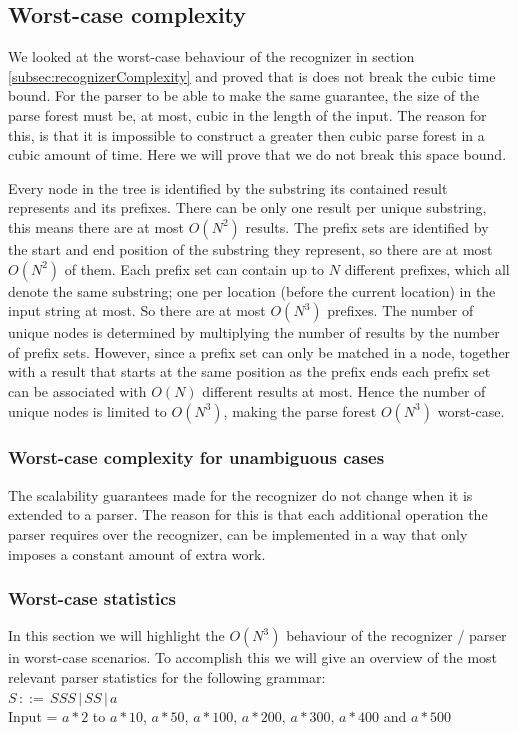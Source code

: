 \documentclass[a4paper,10pt]{article}
\begin{document}
\subsection{Worst-case complexity}

We looked at the worst-case behaviour of the recognizer in section \ref{subsec:recognizerComplexity} and proved that is does not break the cubic time bound. For the parser to be able to make the same guarantee, the size of the parse forest must be, at most, cubic in the length of the input. The reason for this, is that it is impossible to construct a greater then cubic parse forest in a cubic amount of time. Here we will prove that we do not break this space bound.

Every node in the tree is identified by the substring its contained result represents and its prefixes. There can be only one result per unique substring, this means there are at most $O(N^2)$ results. The prefix sets are identified by the start and end position of the substring they represent, so there are at most $O(N^2)$ of them. Each prefix set can contain up to $N$ different prefixes, which all denote the same substring; one per location (before the current location) in the input string at most. So there are at most $O(N^3)$ prefixes. The number of unique nodes is determined by multiplying the number of results by the number of prefix sets. However, since a prefix set can only be matched in a node, together with a result that starts at the same position as the prefix ends each prefix set can be associated with $O(N)$ different results at most. Hence the number of unique nodes is limited to $O(N^3)$, making the parse forest $O(N^3)$ worst-case.

\subsubsection{Worst-case complexity for unambiguous cases}

The scalability guarantees made for the recognizer do not change when it is extended to a parser. The reason for this is that each additional operation the parser requires over the recognizer, can be implemented in a way that only imposes a constant amount of extra work.

\subsubsection{Worst-case statistics}
In this section we will highlight the $O(N^3)$ behaviour of the recognizer / parser in worst-case scenarios. To accomplish this we will give an overview of the most relevant parser statistics for the following grammar:\\
$S\,::=\,SSS\,|\,SS\,|\,a$\\
Input = $a * 2$ to $a * 10$, $a * 50$, $a * 100$, $a * 200$, $a * 300$, $a * 400$ and $a * 500$
\end{document}
